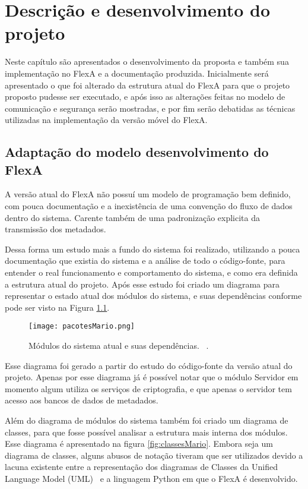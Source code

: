 \chapter{Descrição e desenvolvimento do projeto}


    Neste capítulo são apresentados o desenvolvimento da proposta e também sua implementação no FlexA e a documentação produzida. Inicialmente será apresentado o que foi alterado da estrutura atual do FlexA para que o projeto proposto pudesse ser executado, e após isso as alterações feitas no modelo de comunicação e segurança serão mostradas, e por fim serão debatidas as técnicas utilizadas na implementação da versão móvel do FlexA.


    \section{Adaptação do modelo desenvolvimento do FlexA}

        A versão atual do FlexA não possuí um modelo de programação bem definido, com pouca documentação e a inexistência de uma convenção do fluxo de dados dentro do sistema. Carente também de uma padronização explicita da transmissão dos metadados.
        
        Dessa forma um estudo mais a fundo do sistema foi realizado, utilizando a pouca documentação que existia do sistema e a análise de todo o código-fonte, para entender o real funcionamento e comportamento do sistema, e como era definida a estrutura atual do projeto. Após esse estudo foi criado um diagrama para representar o estado atual dos módulos do sistema, e suas dependências conforme pode ser visto na Figura \ref{fig:pacotesMario}.
        
        \begin{figure}
            \centering
            \texttt{[image: pacotesMario.png]}
            \caption{Módulos do sistema atual e suas dependências. ~\cite{mario}.}
            \label{fig:pacotesMario}
        \end{figure}
        
        Esse diagrama foi gerado a partir do estudo do código-fonte da versão atual do projeto. Apenas por esse diagrama já é possível notar que o módulo Servidor em momento algum utiliza os serviços de criptografia, e que apenas o servidor tem acesso aos bancos de dados de metadados.
        
        Além do diagrama de módulos do sistema também foi criado um diagrama de classes, para que fosse possível analisar a estrutura mais interna dos módulos. Esse diagrama é apresentado na figura \ref{fig:classesMario}. Embora seja um diagrama de classes, alguns abusos de notação tiveram que ser utilizados devido a lacuna existente entre a representação dos diagramas de Classes da Unified Language Model (UML)~\cite{umlClasses} e a linguagem Python em que o FlexA é desenvolvido.
        
